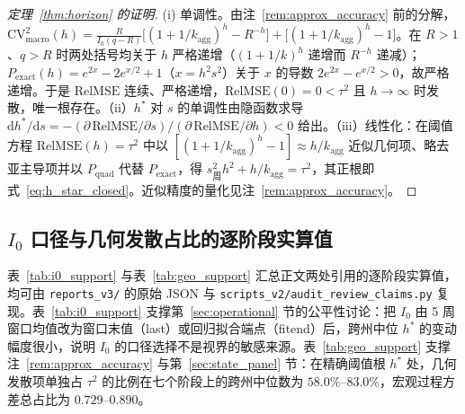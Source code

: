 \documentclass[10pt,UTF8,a4paper,zihao=-4]{ctexart}
\theoremstyle{plain}
\theoremstyle{definition}
\theoremstyle{remark}
\begin{document}
\begin{proof}[定理~\ref{thm:horizon} 的证明]
(i) 单调性。由注~\ref{rem:approx_accuracy} 前的分解，$\text{CV}^2_{\text{macro}}(h) = \frac{R}{I_0(q-R)}\bigl[(1+1/k_{\text{agg}})^h - R^{-h}\bigr] + \bigl[(1+1/k_{\text{agg}})^h - 1\bigr]$。在 $R>1$、$q>R$ 时两处括号均关于 $h$ 严格递增（$(1+1/k)^h$ 递增而 $R^{-h}$ 递减）；$P_{\text{exact}}(h) = e^{2x}-2e^{x/2}+1$（$x = h^2 s^2$）关于 $x$ 的导数 $2e^{2x} - e^{x/2} > 0$，故严格递增。于是 $\text{RelMSE}$ 连续、严格递增，$\text{RelMSE}(0)=0<\tau^2$ 且 $h\to\infty$ 时发散，唯一根存在。（ii）$h^*$ 对 $s$ 的单调性由隐函数求导 $\mathrm{d}h^*/\mathrm{d}s = -(\partial\,\text{RelMSE}/\partial s)/(\partial\,\text{RelMSE}/\partial h) < 0$ 给出。（iii）线性化：在阈值方程 $\text{RelMSE}(h)=\tau^2$ 中以 $[(1+1/k_{\text{agg}})^h-1] \approx h/k_{\text{agg}}$ 近似几何项、略去亚主导项并以 $P_{\text{quad}}$ 代替 $P_{\text{exact}}$，得 $s_{\text{周}}^2 h^2 + h/k_{\text{agg}} = \tau^2$，其正根即式~\eqref{eq:h_star_closed}。近似精度的量化见注~\ref{rem:approx_accuracy}。
\end{proof}

\subsection{$I_0$ 口径与几何发散占比的逐阶段实算值}\label{app:support}

表~\ref{tab:i0_support} 与表~\ref{tab:geo_support} 汇总正文两处引用的逐阶段实算值，均可由 \texttt{reports\_v3/} 的原始 JSON 与 \texttt{scripts\_v2/audit\_review\_claims.py} 复现。表~\ref{tab:i0_support} 支撑第~\ref{sec:operational} 节的公平性讨论：把 $I_0$ 由 5 周窗口均值改为窗口末值（\textsf{last}）或回归拟合端点（\textsf{fitend}）后，跨州中位 $h^*$ 的变动幅度很小，说明 $I_0$ 的口径选择不是视界的敏感来源。表~\ref{tab:geo_support} 支撑注~\ref{rem:approx_accuracy} 与第~\ref{sec:state_panel} 节：在精确阈值根 $h^*$ 处，几何发散项单独占 $\tau^2$ 的比例在七个阶段上的跨州中位数为 $58.0\%$--$83.0\%$，宏观过程方差总占比为 $0.729$--$0.890$。

\begin{table}[htbp]
\centering
\footnotesize
\setlength{\tabcolsep}{4pt}
\caption{$I_0$ 口径重定标下跨州中位 $h^*$ 的相对变动（\%）}
\label{tab:i0_support}

\end{table}

\begin{table}[htbp]
\centering
\footnotesize
\setlength{\tabcolsep}{4pt}
\caption{精确阈值根 $h^*$ 处的方差构成占比（跨州中位数）}
\label{tab:geo_support}

\end{table}
\end{document}
